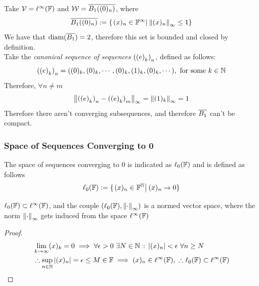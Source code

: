 \documentclass[../complete.tex]{subfiles}
\begin{document}
\begin{eg}
	Take $\mathcal{V}=\ell^\infty(\mathbb{F})$ and $\mathcal{W}=\overline{B_1( (0)_n )}$, where $$\overline{B_1( (0)_n )}:=\{\left.(x)_n\in\mathbb{F}^\infty\right|_{}\norm{(x)_n}_\infty\le1\}$$
	We have that $\operatorname{diam}(\overline{B_1})=2$, therefore this set is bounded and closed by definition.\\
	Take the \textit{canonical sequence of sequences} $\left(\left(e\right)_{k}\right)_{n}$, defined as follows:
	\begin{equation*}
		\seqseq{e}{k}{n}=((0)_k,(0)_k,\cdots,(0)_k,(1)_k,(0)_k,\cdots),\ \text{for some}\ k\in\N
	\end{equation*}
	Therefore, $\forall n\ne m$
	\begin{equation*}
		\norm{\left(\left(e\right)_{k}\right)_{n}-\left(\left(e\right)_{k}\right)_{m}}_{\infty}=\norm{(1)_k}_\infty=1
	\end{equation*}
	Therefore there aren't converging subsequences, and therefore $\overline{B_1}$ can't be compact.
\end{eg}
\subsubsection{Space of Sequences Converging to 0}
\begin{dfn}
	The space of sequences converging to $0$ is indicated as $\ell_0(\mathbb{F})$ and is defined as follows
	\begin{equation}
		\ell_0(\mathbb{F}):=\{\left.(x)_n\in\mathbb{F}^{\mathbb{N}}\right|_{}(x)_n\to0\}
		\label{eq:ellnot}
	\end{equation}
\end{dfn}
\begin{prop}
	$\ell_0(\mathbb{F})\subset\ell^\infty(\mathbb{F})$, and the couple $(\ell_0(\mathbb{F}),\norm{\cdot}_\infty)$ is a normed vector space, where the norm $\norm{\cdot}_\infty$ gets induced from the space $\ell^\infty(\mathbb{F})$
\end{prop}
\begin{proof}
	\begin{equation*}
		\begin{aligned}
			&\lim_{k\to\infty}(x)_k=0\implies{}\forall\epsilon>0\ \exists N\in\N\st\abs{(x)_n}<\epsilon\ \forall n\ge N\\
			&\therefore\sup_{n\in\N}\abs{(x)_n}=\epsilon\le M\in\F\implies{}(x)_n\in\ell^\infty(\F),\ \therefore\ell_0(\F)\subset\ell^\infty(\F)
		\end{aligned}
	\end{equation*}
\end{proof}
\end{document}
